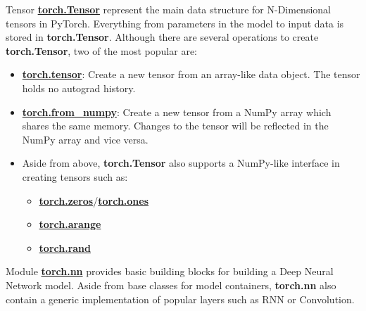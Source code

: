 \documentclass{beamer}
\begin{document}
\begin{frame}[fragile]{Tensor}
    \href{https://pytorch.org/docs/stable/tensors.html#torch.Tensor}{\textbf{torch.Tensor}} represent the main data structure for N-Dimensional tensors in PyTorch. Everything from parameters in the model to input data is stored in \textbf{torch.Tensor}. Although there are several operations to create  \textbf{torch.Tensor}, two of the most popular are:
    \begin{itemize}
        \item \href{https://pytorch.org/docs/stable/generated/torch.tensor.html}{\textbf{torch.tensor}}: Create a new tensor from an array-like data object. The tensor holds no autograd history.
        \item \href{https://pytorch.org/docs/stable/generated/torch.from_numpy.html}{\textbf{torch.from\_numpy}}: Create a new tensor from a NumPy array which shares the same memory. Changes to the tensor will be reflected in the NumPy array and vice versa.
        \item Aside from above, \textbf{torch.Tensor} also supports a NumPy-like interface in creating tensors such as:
        \begin{itemize}
            \item \href{https://pytorch.org/docs/stable/generated/torch.zeros.html}{\textbf{torch.zeros}}/\href{https://pytorch.org/docs/stable/generated/torch.ones.html}{\textbf{torch.ones}}
            \item \href{https://pytorch.org/docs/stable/generated/torch.arange.html}{\textbf{torch.arange}}
            \item \href{https://pytorch.org/docs/stable/generated/torch.rand.html}{\textbf{torch.rand}}
        \end{itemize}
    \end{itemize}
\end{frame}

\begin{frame}[fragile]{Module}
    \href{https://pytorch.org/docs/stable/nn.html}{\textbf{torch.nn}} provides basic building blocks for building a Deep Neural Network model. Aside from base classes for model containers, \textbf{torch.nn} also contain a generic implementation of popular layers such as RNN or Convolution.
\end{frame}
\end{document}
